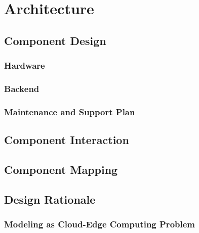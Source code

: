 
\chapter{Architecture}
\label{chp:architecture}

\section{Component Design}
\subsection{Hardware}
\subsection{Backend}
\subsection{Maintenance and Support Plan}

\section{Component Interaction}

\section{Component Mapping}

\section{Design Rationale}
\subsection{Modeling as Cloud-Edge Computing Problem}
